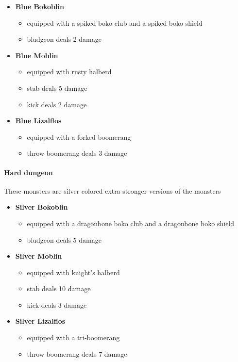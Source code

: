 \begin{itemize}
\tightlist
\item
  \textbf{Blue Bokoblin}

  \begin{itemize}
  \tightlist
  \item
    equipped with a spiked boko club and a spiked boko shield
  \item
    bludgeon deals 2 damage
  \end{itemize}
\item
  \textbf{Blue Moblin}

  \begin{itemize}
  \tightlist
  \item
    equipped with rusty halberd
  \item
    stab deals 5 damage
  \item
    kick deals 2 damage
  \end{itemize}
\item
  \textbf{Blue Lizalflos}

  \begin{itemize}
  \tightlist
  \item
    equipped with a forked boomerang
  \item
    throw boomerang deals 3 damage
  \end{itemize}
\end{itemize}

\paragraph{Hard dungeon}\label{creational-patterns.md__hard-dungeon}

These monsters are silver colored extra stronger versions of the
monsters

\begin{itemize}
\tightlist
\item
  \textbf{Silver Bokoblin}

  \begin{itemize}
  \tightlist
  \item
    equipped with a dragonbone boko club and a dragonbone boko shield
  \item
    bludgeon deals 5 damage
  \end{itemize}
\item
  \textbf{Silver Moblin}

  \begin{itemize}
  \tightlist
  \item
    equipped with knight's halberd
  \item
    stab deals 10 damage
  \item
    kick deals 3 damage
  \end{itemize}
\item
  \textbf{Silver Lizalflos}

  \begin{itemize}
  \tightlist
  \item
    equipped with a tri-boomerang
  \item
    throw boomerang deals 7 damage
  \end{itemize}
\end{itemize}

